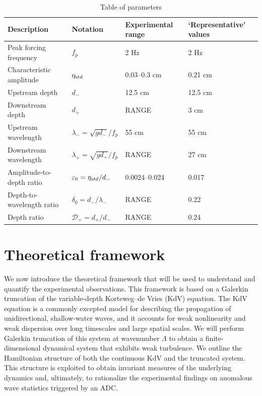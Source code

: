 \documentclass[11pt]{article}
\newcommand{\eps}{\varepsilon}
\newcommand{\etastd}{\eta_{\text std}}
\newcommand{\depth}{d}
\newcommand{\dup}{\depth_{-}}
\newcommand{\ddn}{\depth_{+}}
\newcommand{\lam}{\lambda}
\newcommand{\lamup}{\lam_{-}}
\newcommand{\lamdn}{\lam_{+}}
\newcommand{\drat}{\mathcal{D}}
\newcommand{\dratdn}{\drat_+}
\newcommand{\epsup}{\eps_0}
\newcommand{\delup}{\delta_0}
\begin{document}
\begin{table}[h]%
\begin{center}
\caption{Table of parameters}
\label{paramtable}
\begin{tabular}{l l l l}
\hline Description & Notation & Experimental range & `Representative' values \\
\hline
Peak forcing frequency	& $f_p$					& 2 Hz 		& 2 Hz \\
Characteristic amplitude	& $\etastd$				& 0.03--0.3 cm	& 0.21 cm \\
Upstream depth		& $\dup$					& 12.5 cm 	& 12.5 cm \\
Downstream depth		& $\ddn$					& RANGE		& 3 cm \\
Upstream wavelength	& $\lamup = \sqrt{g \dup}/f_p$	& 55 cm 		& 55 cm \\
Downstream wavelength	& $\lamdn = \sqrt{g \ddn}/f_p$	& RANGE		& 27 cm \\
%
Amplitude-to-depth ratio	& $\epsup = \etastd / \dup$	&0.0024--0.024	& 0.017 \\
Depth-to-wavelength ratio	& $\delup = \dup / \lamup$	& RANGE		& 0.22 \\
Depth ratio			& $\dratdn = \ddn/\dup$		& RANGE		& 0.24 \\
\end{tabular}
\end{center}
\end{table}


\section{Theoretical framework}

We now introduce the theoretical framework that will be used to understand and quantify the experimental observations. This framework is based on a Galerkin truncation of the variable-depth Korteweg–de Vries (KdV) equation. The KdV equation is a commonly excepted model for describing the propagation of unidirectional, shallow-water waves, and it accounts for weak nonlinearity and weak dispersion over long timescales and large spatial scales. We will perform Galerkin truncation of this system at wavenumber $\Lambda$ to obtain a finite-dimensional dynamical system that exhibits weak turbulence. We outline the Hamiltonian structure of both the continuous KdV and the truncated system. This structure is exploited to obtain invariant measures of the underlying dynamics and, ultimately, to rationalize the experimental findings on anomalous wave statistics triggered by an ADC.
\end{document}
